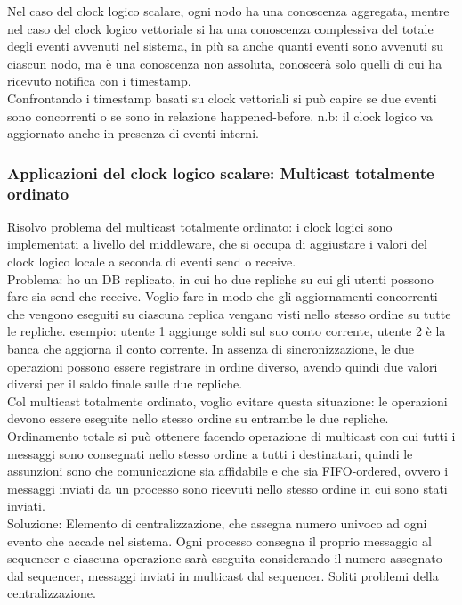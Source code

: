 \documentclass{article}
\begin{document}
Nel caso del clock logico scalare, ogni nodo ha una conoscenza aggregata, mentre nel caso del clock logico vettoriale si ha una conoscenza complessiva del totale degli eventi avvenuti nel sistema, in più sa anche quanti eventi sono avvenuti su ciascun nodo, ma è una conoscenza non assoluta, conoscerà solo quelli di cui ha ricevuto notifica con i timestamp.\\ Confrontando i timestamp basati su clock vettoriali si può capire se due eventi sono concorrenti o se sono in relazione happened-before. n.b: il clock logico va aggiornato anche in presenza di eventi interni.
\subsubsection{Applicazioni del clock logico scalare: Multicast totalmente ordinato}
Risolvo problema del multicast totalmente ordinato: i clock logici sono implementati a livello del middleware, che si occupa di aggiustare i valori del clock logico locale a seconda di eventi send o receive.\\ Problema: ho un DB replicato, in cui ho due repliche su cui gli utenti possono fare sia send che receive. Voglio fare in modo che gli aggiornamenti concorrenti che vengono eseguiti su ciascuna replica vengano visti nello stesso ordine su tutte le repliche. esempio: utente 1 aggiunge soldi sul suo conto corrente, utente 2 è la banca che aggiorna il conto corrente. In assenza di sincronizzazione, le due operazioni possono essere registrare in ordine diverso, avendo quindi due valori diversi per il saldo finale sulle due repliche.\\ Col multicast totalmente ordinato, voglio evitare questa situazione: le operazioni devono essere eseguite nello stesso ordine su entrambe le due repliche.\\ Ordinamento totale si può ottenere facendo operazione di multicast con cui tutti i messaggi sono consegnati nello stesso ordine a tutti i destinatari, quindi le assunzioni sono che comunicazione sia affidabile e che sia FIFO-ordered, ovvero i messaggi inviati da un processo sono ricevuti nello stesso ordine in cui sono stati inviati.\\ Soluzione:
Elemento di centralizzazione, che assegna numero univoco ad ogni evento che accade nel sistema. Ogni processo consegna il proprio messaggio al sequencer e ciascuna operazione sarà eseguita considerando il numero assegnato dal sequencer, messaggi inviati in multicast dal sequencer. Soliti problemi della centralizzazione.
\end{document}
